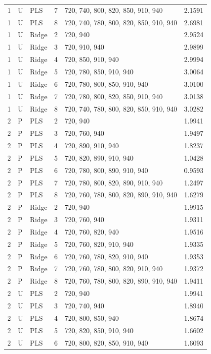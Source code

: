 \documentclass[10pt,a4paper]{article}
\begin{document}
\begin{longtable}{rllrlr}
1 & U & PLS & 7 & 720, 740, 800, 820, 850, 910, 940 & 2.1591 \\
1 & U & PLS & 8 & 720, 740, 780, 800, 820, 850, 910, 940 & 2.6981 \\
1 & U & Ridge & 2 & 720, 940 & 2.9524 \\
1 & U & Ridge & 3 & 720, 910, 940 & 2.9899 \\
1 & U & Ridge & 4 & 720, 850, 910, 940 & 2.9994 \\
1 & U & Ridge & 5 & 720, 780, 850, 910, 940 & 3.0064 \\
1 & U & Ridge & 6 & 720, 780, 800, 850, 910, 940 & 3.0100 \\
1 & U & Ridge & 7 & 720, 780, 800, 820, 850, 910, 940 & 3.0138 \\
1 & U & Ridge & 8 & 720, 740, 780, 800, 820, 850, 910, 940 & 3.0282 \\
2 & P & PLS & 2 & 720, 940 & 1.9941 \\
2 & P & PLS & 3 & 720, 760, 940 & 1.9497 \\
2 & P & PLS & 4 & 720, 890, 910, 940 & 1.8237 \\
2 & P & PLS & 5 & 720, 820, 890, 910, 940 & 1.0428 \\
2 & P & PLS & 6 & 720, 780, 800, 890, 910, 940 & 0.9593 \\
2 & P & PLS & 7 & 720, 780, 800, 820, 890, 910, 940 & 1.2497 \\
2 & P & PLS & 8 & 720, 760, 780, 800, 820, 890, 910, 940 & 1.6279 \\
2 & P & Ridge & 2 & 720, 940 & 1.9915 \\
2 & P & Ridge & 3 & 720, 760, 940 & 1.9311 \\
2 & P & Ridge & 4 & 720, 760, 820, 940 & 1.9516 \\
2 & P & Ridge & 5 & 720, 760, 820, 910, 940 & 1.9335 \\
2 & P & Ridge & 6 & 720, 760, 780, 820, 910, 940 & 1.9353 \\
2 & P & Ridge & 7 & 720, 760, 780, 800, 820, 910, 940 & 1.9372 \\
2 & P & Ridge & 8 & 720, 760, 780, 800, 820, 890, 910, 940 & 1.9411 \\
2 & U & PLS & 2 & 720, 940 & 1.9941 \\
2 & U & PLS & 3 & 720, 740, 940 & 1.8940 \\
2 & U & PLS & 4 & 720, 800, 850, 940 & 1.8674 \\
2 & U & PLS & 5 & 720, 820, 850, 910, 940 & 1.6602 \\
2 & U & PLS & 6 & 720, 800, 820, 850, 910, 940 & 1.6093 \\

\end{longtable}
\end{document}
